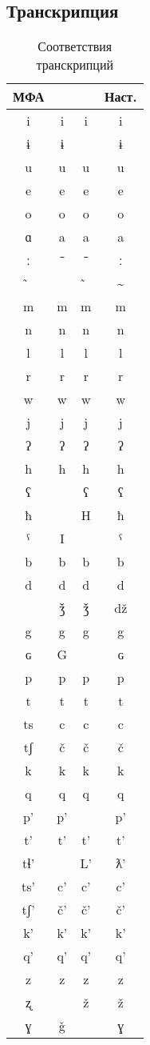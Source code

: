 
\begin{appendices}
\chapter{Транскрипция} \label{app1}

\begin{table}[ht]
\caption{Соответствия транскрипций}
\vspace{0.3cm}
\centering
\label{tab:transcr}
\begin{tabular}{cccc}

МФА	&	\citep{tsakhurgram}	&	\citep{bagvalalgram}	&	Наст.	\\ \hline
i	&	i	&	i	&	i	\\
ɨ	&	ɨ	&		&	ɨ	\\
u	&	u	&	u	&	u	\\
e	&	e	&	e	&	e	\\
o	&	o	&	o	&	o	\\
ɑ	&	a	&	a	&	a	\\
ː	&	ˉ	&	ˉ	&	ː	\\
̃	&		&	̃	&	\textasciitilde{}	\\
m	&	m	&	m	&	m	\\
n	&	n	&	n	&	n	\\
l	&	l	&	l	&	l	\\
r	&	r	&	r	&	r	\\
w	&	w	&	w	&	w	\\
j	&	j	&	j	&	j	\\
ʔ	&	ʔ	&	ʔ	&	ʔ	\\
h	&	h	&	h	&	h	\\
ʕ	&		&	ʕ	&	ʕ	\\
ħ	&		&	H	&	ħ	\\
ˁ	&	I	&		&	ˁ	\\
b	&	b	&	b	&	b	\\
d	&	d	&	d	&	d	\\
	&	ǯ	&	ǯ	&	dž	\\
g	&	g	&	g	&	g	\\
ɢ	&	G	&		&	ɢ	\\
p	&	p	&	p	&	p	\\
t	&	t	&	t	&	t	\\
ts	&	c	&	c	&	c	\\
tʃ	&	č	&	č	&	č	\\
k	&	k	&	k	&	k	\\
q	&	q	&	q	&	q	\\
p’	&	p’	&		&	p’	\\
t’	&	t’	&	t’	&	t’	\\
tɬ’	&		&	L’	&	ƛ’	\\
ts’	&	c’	&	c’	&	c’	\\
tʃ’	&	č’	&	č’	&	č’	\\
k’	&	k’	&	k’	&	k’	\\
q’	&	q’	&	q’	&	q’	\\
z	&	z	&	z	&	z	\\
ʐ	&		&	ž	&	ž	\\
ɣ	&	ǧ	&		&	ɣ	\\
\end{tabular}
\end{table}


\end{appendices}

